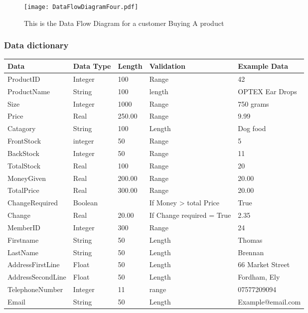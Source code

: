 \begin{figure}[H]
\texttt{[image: DataFlowDiagramFour.pdf]}
\caption{This is the Data Flow Diagram for a customer Buying A product} \label{fig:DataFlowDiagram4}
\end{figure}

\subsubsection{Data dictionary}

\begin{center}
    \begin{tabular}{|p{3cm}|p{3cm}|p{2cm}|p{3cm}|p{3cm}|}
        \hline
        \textbf{Data} & \textbf{Data Type} & \textbf{Length} & \textbf{Validation} & \textbf{Example Data}\\ \hline
        
          ProductID & Integer & 100 & Range & 42 \\ \hline
          ProductName & String & 100 & length & OPTEX Ear Drops \\ \hline
          Size & Integer & 1000 & Range & 750 grams \\ \hline
          Price & Real & 250.00 & Range & 9.99 \\ \hline
          Catagory & String & 100 & Length & Dog food \\ \hline
          FrontStock & integer & 50 & Range & 5 \\ \hline
          BackStock & Integer & 50 & Range & 11 \\ \hline
          TotalStock & Real & 100 & Range & 20 \\ \hline
          MoneyGiven & Real & 200.00 & Range & 20.00 \\ \hline
          TotalPrice  & Real & 300.00 & Range & 20.00 \\ \hline
          ChangeRequired & Boolean & & If Money > total Price & True \\ \hline
          Change & Real & 20.00 & If Change required = True & 2.35 \\ \hline
          MemberID & Integer & 300 & Range & 24 \\ \hline
          Firstname & String & 50 & Length & Thomas \\ \hline
          LastName & String & 50 & Length & Brennan \\ \hline
          AddressFirstLine & Float & 50 & Length & 66 Market Street \\ \hline
          AddressSecondLine & Float & 50 & Length & Fordham, Ely \\ \hline
          TelephoneNumber & Integer & 11 & range & 07577209094 \\ \hline
          Email & String & 50 & Length & Example@email.com \\ \hline
          
  \end{tabular}
\end{center}

